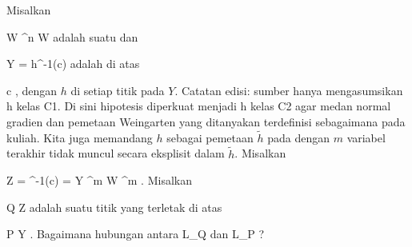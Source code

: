 {}
{

Misalkan

\mavergleichskette
{\vergleichskette
{ W
}
{ \subseteq }{ \R^n
}
{  }{
}
{    }{
}
{   }{
}
}
{}{}{}
 { W } { \R
} {}
adalah suatu
dan

\mavergleichskette
{\vergleichskette
{ Y
}
{ = }{ h^{-1}(c)
}
{  }{
}
{    }{
}
{   }{
}
}
{}{}{}
adalah
di atas

\mavergleichskette
{\vergleichskette
{ c
}
{ \in }{ \R
}
{  }{
}
{    }{
}
{   }{
}
}
{}{}{,}
dengan $h$
di setiap titik pada $Y$.
Catatan edisi: sumber hanya mengasumsikan h kelas C1. Di sini hipotesis diperkuat menjadi h kelas C2 agar medan normal gradien dan pemetaan Weingarten yang ditanyakan terdefinisi sebagaimana pada kuliah.
Kita juga memandang $h$ sebagai pemetaan $\tilde{h}$ pada
dengan $m$ variabel terakhir tidak muncul secara eksplisit dalam $\tilde{h}$. Misalkan

\mavergleichskettedisp
{\vergleichskette
{ Z
}
{ =} { ^{-1}(c)
}
{ =} { Y \times \R^m
}
{ \subseteq} { W \times \R^{m}
}
{ } {
}
}
{}{}{.}
Misalkan

\mavergleichskette
{\vergleichskette
{ Q
}
{ \in }{ Z
}
{  }{
}
{    }{
}
{   }{
}
}
{}{}{}
adalah suatu titik yang terletak di atas

\mavergleichskette
{\vergleichskette
{ P
}
{ \in }{ Y
}
{  }{
}
{    }{
}
{   }{
}
}
{}{}{.}
Bagaimana hubungan antara
\mathkor {} {L_Q} {dan} {L_P} {?}

}
{} {}

